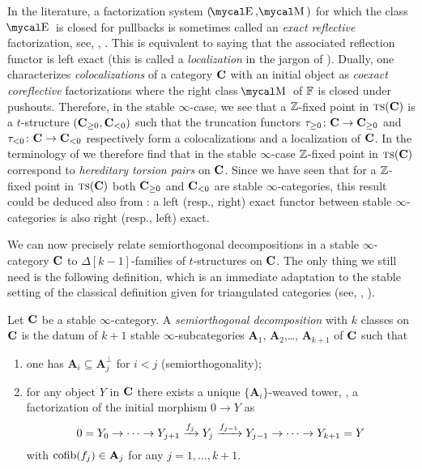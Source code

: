 \begin{remark}\label{oss.hereditary}
In the literature, a factorization system $(\EE,\MM)$ for which the class $\EE$ is closed for pullbacks is sometimes called an \emph{exact reflective} factorization, see, \eg, \cite{CHK}. This is equivalent to saying that the associated reflection functor is left exact (this is called a \emph{localization} in the jargon of \cite{CHK}). Dually,  one characterizes \emph{colocalizations} of a category $\textbf{C}$ with an initial object as \emph{coexact coreflective} factorizations where the right class $\MM$ of $\mathbb{F}$ is closed under pushouts.  Therefore, in the stable $\infty$\hyp{}case, we see that a $\mathbb{Z} $\hyp{}fixed point in $\text{\scshape ts}(\textbf{C})$ is a $t$\hyp{}structure $(\textbf{C}_{\geq 0},\textbf{C}_{<0})$ such that the truncation functors $\tau_{\ge 0}\colon \textbf{C}\to \textbf{C}_{\ge 0}$ and $\tau_{<0}\colon \textbf{C}\to \textbf{C}_{<0}$ respectively form a colocalizations and a localization of $\textbf{C}$. In the terminology of \cite{Beligiannisreiten} we therefore find that in the stable $\infty$\hyp{}case $\mathbb{Z} $\hyp{}fixed point in $\text{\scshape ts}(\textbf{C})$ correspond to \emph{hereditary torsion pairs} on $\textbf{C}$. Since we have seen that for a $\mathbb{Z} $\hyp{}fixed point in $\text{\scshape ts}(\textbf{C})$ both $\textbf{C}_{\geq 0}$ and $\textbf{C}_{<0}$ are stable $\infty$\hyp{}categories, this result could be deduced also from \cite[Prop. \textbf{1.1.4.1}]{LurieHA}: a left (resp., right) exact functor between stable $\infty$\hyp{}categories is also right (resp., left) exact.
 \end{remark}
We can now precisely relate semiorthogonal decompositions in a stable $\infty$\hyp{}category $\textbf{C}$ to $\Delta[k-1]$\hyp{}families of $t$\hyp{}structures on $\textbf{C}$. The only thing we still need is the following definition, which is an immediate adaptation to the stable setting of the classical definition given for triangulated categories (see, \eg, \cite{Bondal1995, Kuz} ).
\begin{definition}
Let $\textbf{C}$ be a stable $\infty$\hyp{}category. A \emph{semiorthogonal decomposition} with $k$ classes on $\textbf{C}$ is the datum of $k+1$ stable $\infty$\hyp{}subcategories $\mathbf{A}_1$, $\mathbf{A}_2$,\dots, $\mathbf{A}_{k+1}$ of $\textbf{C}$ such that
\begin{enumerate}
\item one has $\mathbf{A}_i\subseteq \mathbf{A}_j^\perp$ for $i<j$ (semiorthogonality);
\item for any object $Y$ in $\textbf{C}$ there exists a unique $\{\mathbf{A}_i\}$\hyp{}weaved tower, \ie, a factorization of the initial morphism $0\to Y$ as 
\[
0 =Y_0\to\cdots \to Y_{j+1} \xrightarrow{f_{j}} Y_{j} \xrightarrow{f_{j-1}}Y_{j-1}\to \cdots\to Y_{k+1}=Y
\]
with $\text{cofib}(f_j)\in \mathbf{A}_j$ for any $j=1,\dots, k+1$. 
\end{enumerate} 
\end{definition}
